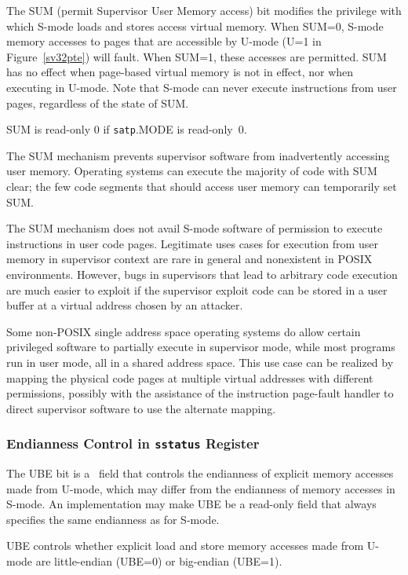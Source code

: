 The SUM (permit Supervisor User Memory access) bit modifies the privilege with
which S-mode loads and stores access virtual memory.
When SUM=0, S-mode memory accesses to pages that are accessible by U-mode (U=1
in Figure~\ref{sv32pte}) will fault.  When SUM=1, these accesses are permitted.
SUM has no effect when page-based virtual memory is not in effect, nor when
executing in U-mode.  Note that S-mode can never execute instructions from user
pages, regardless of the state of SUM.

SUM is read-only 0 if {\tt satp}.MODE is read-only~0.

\begin{commentary}
The SUM mechanism prevents supervisor software from inadvertently accessing
user memory.  Operating systems can execute the majority of code with SUM clear;
the few code segments that should access user memory can temporarily set
SUM.

The SUM mechanism does not avail S-mode software of permission to execute
instructions in user code pages.  Legitimate uses cases for execution from
user memory in supervisor context are rare in general and nonexistent in POSIX
environments.  However, bugs in supervisors that lead to arbitrary code
execution are much easier to exploit if the supervisor exploit code can be
stored in a user buffer at a virtual address chosen by an attacker.

Some non-POSIX single address space operating systems do allow certain
privileged software to partially execute in supervisor mode, while most
programs run in user mode, all in a shared address space.  This use case can
be realized by mapping the physical code pages at multiple virtual addresses
with different permissions, possibly with the assistance of the
instruction page-fault handler to direct supervisor software to use the
alternate mapping.
\end{commentary}

\subsubsection{Endianness Control in {\tt sstatus} Register}

The UBE bit is a \warl\ field that controls the endianness of explicit
memory accesses made from U-mode, which may differ from the endianness of
memory accesses in S-mode.
An implementation may make UBE be a read-only field that always specifies
the same endianness as for S-mode.

UBE controls whether explicit
load and store memory accesses made from U-mode are little-endian (UBE=0)
or big-endian (UBE=1).

